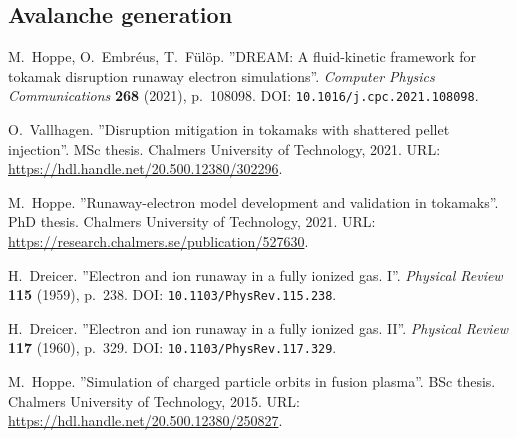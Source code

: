 \documentclass[11pt,a4paper]{article}
\begin{document}
\subsection{Avalanche generation}
\label{sec:avalanche}
\begin{thebibliography}{100}
    M.\ Hoppe, O.\ Embréus, T.\ Fülöp. ''DREAM: A fluid-kinetic framework for tokamak disruption runaway electron simulations''. \textit{Computer Physics Communications} \textbf{268} (2021), p.\ 108098. DOI: \texttt{10.1016/j.cpc.2021.108098}.

    O.\ Vallhagen. ''Disruption mitigation in tokamaks with shattered pellet injection''. MSc thesis. Chalmers University of Technology, 2021. URL: \url{https://hdl.handle.net/20.500.12380/302296}.

    M.\ Hoppe. ''Runaway-electron model development and validation in tokamaks''. PhD thesis. Chalmers University of Technology, 2021. URL: \url{https://research.chalmers.se/publication/527630}.

    H.\ Dreicer. ''Electron and ion runaway in a fully ionized gas. I''. \textit{Physical Review} \textbf{115} (1959), p.\ 238. DOI: \texttt{10.1103/PhysRev.115.238}.

    H.\ Dreicer. ''Electron and ion runaway in a fully ionized gas. II''. \textit{Physical Review} \textbf{117} (1960), p.\ 329. DOI: \texttt{10.1103/PhysRev.117.329}.


    M.\ Hoppe. ''Simulation of charged particle orbits in fusion plasma''. BSc thesis. Chalmers University of Technology, 2015. URL: \url{https://hdl.handle.net/20.500.12380/250827}.

\end{thebibliography}
\end{document}
